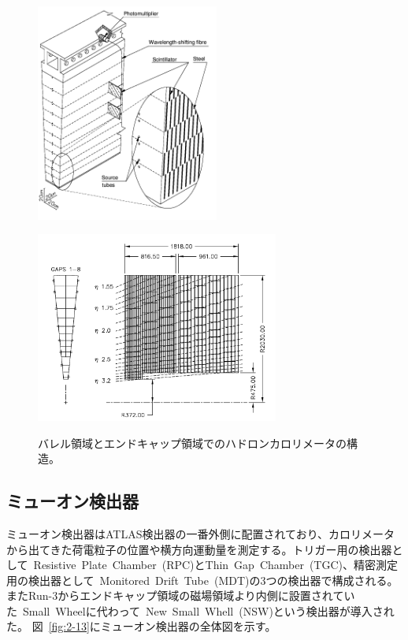 \begin{figure}[h]
  \begin{minipage}[b]{0.5\linewidth}
      \centering
      \includegraphics[clip, width=6cm]{fig/2/TileCalo.png}
      \label{fig:2-12-1}
  \end{minipage}
    \begin{minipage}[b]{0.5\linewidth}
      \centering
      \includegraphics[clip, width=8cm]{fig/2/HadronEndcapCal.png}
      \label{fig:2-12-2}
  \end{minipage}
  \caption{バレル領域とエンドキャップ領域でのハドロンカロリメータの構造\cite{Aad:1129811}。}
\end{figure}


\subsection{ミューオン検出器}\label{section2-2-5}
ミューオン検出器はATLAS検出器の一番外側に配置されており、カロリメータから出てきた荷電粒子の位置や横方向運動量を測定する。トリガー用の検出器として~Resistive~Plate~Chamber~(RPC)とThin~Gap~Chamber~(TGC)、精密測定用の検出器として~Monitored~Drift~Tube~(MDT)の3つの検出器で構成される。またRun-3からエンドキャップ領域の磁場領域より内側に設置されていた~Small~Wheelに代わって~New~Small~Whell~(NSW)という検出器が導入された。
図~\ref{fig:2-13}にミューオン検出器の全体図を示す。

